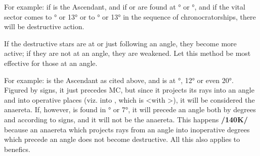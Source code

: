 For example: if \Aries\xspace is the Ascendant, and if \Saturn\xspace or \Mars\xspace are found at \Taurus\xspace 15° or \Gemini\xspace 15°, and if the vital sector comes to \Taurus\xspace 12° or 13° or to \Gemini\xspace 12° or 13° in
the sequence of chronocratorships, there will be destructive action.

If the destructive stars are at or just following an angle, they become more active; if they are not at an angle, they are weakened. Let this method be most effective for those at an angle. 

For example: \Aries\xspace is the Ascendant as cited above, and \Saturn\xspace is at \Sagittarius\xspace 13°, 12° or even 20°. Figured by signs, it just precedes MC, but since it projects its rays into an angle and into operative places (viz. into \Aries, which is \Trine\xspace <with \Sagittarius>), it will be considered the anaereta. If, however, \Saturn\xspace is found in \Sagittarius\xspace 3° or 7°, it will precede an angle both by degrees and according to signs, and it will not be the anaereta. This happens \textbf{/140K/} because an anaereta which projects rays from an angle into inoperative degrees which precede an angle does not become destructive. All this also applies to benefics.


